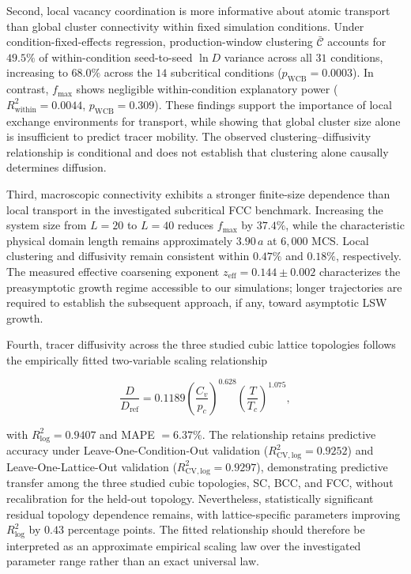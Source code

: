 \documentclass[aps,pre,reprint,superscriptaddress,amsmath,amssymb,floatfix]{revtex4-2}
\begin{document}
Second, local vacancy coordination is more informative about atomic transport than global cluster connectivity within fixed simulation conditions. Under condition-fixed-effects regression, production-window clustering $\bar{\mathcal{C}}$ accounts for $49.5\%$ of within-condition seed-to-seed $\ln D$ variance across all $31$ conditions, increasing to $68.0\%$ across the $14$ subcritical conditions ($p_{\mathrm{WCB}}=0.0003$). In contrast, $f_{\max}$ shows negligible within-condition explanatory power ($R^2_{\mathrm{within}}=0.0044$, $p_{\mathrm{WCB}}=0.309$). These findings support the importance of local exchange environments for transport, while showing that global cluster size alone is insufficient to predict tracer mobility. The observed clustering--diffusivity relationship is conditional and does not establish that clustering alone causally determines diffusion.

Third, macroscopic connectivity exhibits a stronger finite-size dependence than local transport in the investigated subcritical FCC benchmark. Increasing the system size from $L=20$ to $L=40$ reduces $f_{\max}$ by $37.4\%$, while the characteristic physical domain length remains approximately $3.90\,a$ at $6{,}000$ MCS. Local clustering and diffusivity remain consistent within $0.47\%$ and $0.18\%$, respectively. The measured effective coarsening exponent $z_{\mathrm{eff}}=0.144\pm0.002$ characterizes the preasymptotic growth regime accessible to our simulations; longer trajectories are required to establish the subsequent approach, if any, toward asymptotic LSW growth.

Fourth, tracer diffusivity across the three studied cubic lattice topologies follows the empirically fitted two-variable scaling relationship

\begin{equation}
\frac{D}{D_{\mathrm{ref}}}
=
0.1189
\left(\frac{C_v}{p_c}\right)^{0.628}
\left(\frac{T}{T_c}\right)^{1.075},
\end{equation}

with $R^2_{\log}=0.9407$ and MAPE $=6.37\%$. The relationship retains predictive accuracy under Leave-One-Condition-Out validation ($R^2_{\mathrm{CV,log}}=0.9252$) and Leave-One-Lattice-Out validation ($R^2_{\mathrm{CV,log}}=0.9297$), demonstrating predictive transfer among the three studied cubic topologies, SC, BCC, and FCC, without recalibration for the held-out topology. Nevertheless, statistically significant residual topology dependence remains, with lattice-specific parameters improving $R^2_{\log}$ by $0.43$ percentage points. The fitted relationship should therefore be interpreted as an approximate empirical scaling law over the investigated parameter range rather than an exact universal law.
\end{document}
